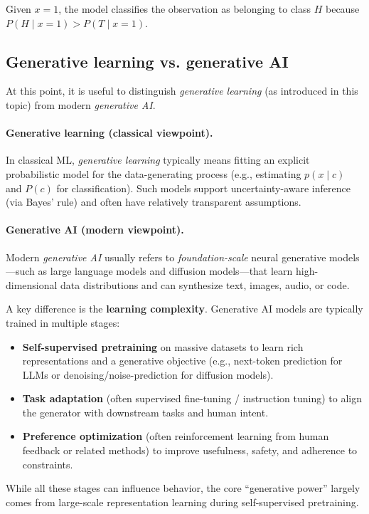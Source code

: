 \documentclass[12pt]{article}
\begin{document}
Given $x=1$, the model classifies the observation as belonging to class $H$ because $P(H\mid x=1) > P(T\mid x=1)$.

\subsection{Generative learning vs. generative AI}
At this point, it is useful to distinguish \emph{generative learning} (as introduced in this topic) from modern \emph{generative AI}.

\paragraph{Generative learning (classical viewpoint).}
In classical ML, \emph{generative learning} typically means fitting an explicit probabilistic model for the data-generating process (e.g., estimating $p(x\mid c)$ and $P(c)$ for classification). Such models support uncertainty-aware inference (via Bayes' rule) and often have relatively transparent assumptions.

\paragraph{Generative AI (modern viewpoint).}
Modern \emph{generative AI} usually refers to \emph{foundation-scale} neural generative models---such as large language models and diffusion models---that learn high-dimensional data distributions and can synthesize text, images, audio, or code.

A key difference is the \textbf{learning complexity}. Generative AI models are typically trained in multiple stages:
\begin{itemize}
\item \textbf{Self-supervised pretraining} on massive datasets to learn rich representations and a generative objective (e.g., next-token prediction for LLMs or denoising/noise-prediction for diffusion models).
\item \textbf{Task adaptation} (often supervised fine-tuning / instruction tuning) to align the generator with downstream tasks and human intent.
\item \textbf{Preference optimization} (often reinforcement learning from human feedback or related methods) to improve usefulness, safety, and adherence to constraints.
\end{itemize}

While all these stages can influence behavior, the core ``generative power'' largely comes from large-scale representation learning during self-supervised pretraining.
\end{document}
